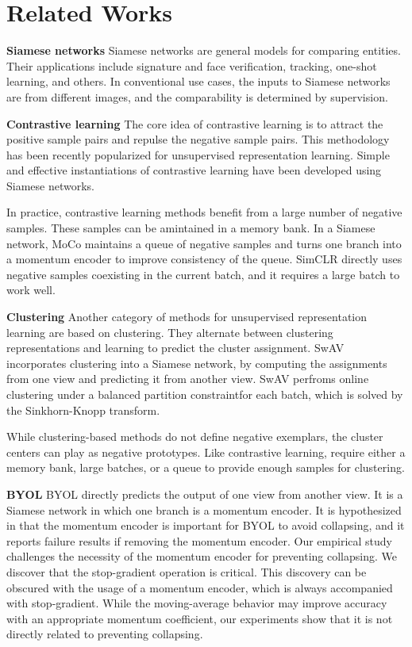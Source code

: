 \documentclass[conference]{IEEEtran}
\begin{document}
\section{Related Works}
\textbf{Siamese networks}
Siamese networks are general models for comparing entities. Their applications include signature and face verification, tracking, one-shot learning, and others. In conventional use cases, the inputs to Siamese networks are from different images, and the 
comparability is determined by supervision.

\textbf{Contrastive learning}
The core idea of contrastive learning is to attract the positive sample pairs and repulse the negative sample pairs.
This methodology has been recently popularized for unsupervised representation learning. Simple and effective instantiations of contrastive learning have been developed 
using Siamese networks.

In practice, contrastive learning methods benefit from a large number of negative samples. These samples can be amintained in a memory bank. In a Siamese network, MoCo maintains a queue of negative samples and turns one branch into a momentum encoder to improve consistency of the queue.
SimCLR directly uses negative samples coexisting in the current batch, and it requires a large batch to work well. 

\textbf{Clustering} Another category of methods for unsupervised representation learning are based on clustering.
They alternate between clustering representations and learning to predict the cluster assignment.
SwAV incorporates clustering into a Siamese network, by computing the assignments from one view and predicting it from another view.
SwAV perfroms online clustering under a balanced partition constraintfor each batch, which is solved by the Sinkhorn-Knopp transform.

While clustering-based methods do not define negative exemplars, the cluster centers can play as negative prototypes. Like contrastive learning, 
require either a memory bank, large batches, or a queue to provide enough samples for clustering.

\textbf{BYOL} BYOL directly predicts the output of one view from another view. It is a Siamese network in which one branch is a momentum encoder. It is hypothesized in that the momentum encoder is important for BYOL to avoid collapsing,
and it reports failure results if removing the momentum encoder. Our empirical study challenges the necessity of the momentum encoder for preventing collapsing.
We discover that the stop-gradient operation is critical. This discovery can be obscured with the usage of a momentum encoder, which is always accompanied with stop-gradient. While the moving-average behavior may improve accuracy with an appropriate momentum coefficient, our experiments show that it is not directly related to preventing collapsing.




\end{document}
